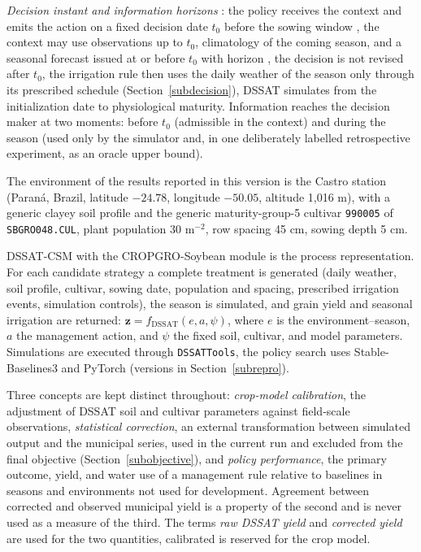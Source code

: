\documentclass[times,final,authoryear]{elsarticle}
\begin{document}
\emph{Decision instant and information horizons} : the policy receives the context and emits the action on a fixed decision date $t_0$ before the sowing window , the context may use observations up to $t_0$, climatology of the coming season, and a seasonal forecast issued at or before $t_0$ with horizon , the decision is not revised after $t_0$, the irrigation rule then uses the daily weather of the season only through its prescribed schedule (Section~\ref{subdecision}), DSSAT simulates from the initialization date to physiological maturity. Information reaches the decision maker at two moments: before $t_0$ (admissible in the context) and during the season (used only by the simulator and, in one deliberately labelled retrospective experiment, as an oracle upper bound).

The environment of the results reported in this version is the Castro station (Paraná, Brazil, latitude $-24.78$, longitude $-50.05$, altitude 1,016 m), with a generic clayey soil profile and the generic maturity-group-5 cultivar \texttt{990005} of \texttt{SBGRO048.CUL}, plant population 30 m$^{-2}$, row spacing 45 cm, sowing depth 5 cm. 

DSSAT-CSM with the CROPGRO-Soybean module is the process representation. For each candidate strategy a complete treatment is generated (daily weather, soil profile, cultivar, sowing date, population and spacing, prescribed irrigation events, simulation controls), the season is simulated, and grain yield and seasonal irrigation are returned: $\mathbf{z} = f_{\text{DSSAT}}(e,a,\psi)$, where $e$ is the environment--season, $a$ the management action, and $\psi$ the fixed soil, cultivar, and model parameters. Simulations are executed through \texttt{DSSATTools}, the policy search uses Stable-Baselines3 and PyTorch (versions in Section~\ref{subrepro}).

Three concepts are kept distinct throughout: \emph{crop-model calibration}, the adjustment of DSSAT soil and cultivar parameters against field-scale observations, \emph{statistical correction}, an external transformation between simulated output and the municipal series, used in the current run and excluded from the final objective (Section~\ref{subobjective}), and \emph{policy performance}, the primary outcome, yield, and water use of a management rule relative to baselines in seasons and environments not used for development. Agreement between corrected and observed municipal yield is a property of the second and is never used as a measure of the third. The terms \emph{raw DSSAT yield} and \emph{corrected yield} are used for the two quantities, calibrated is reserved for the crop model.
\end{document}
